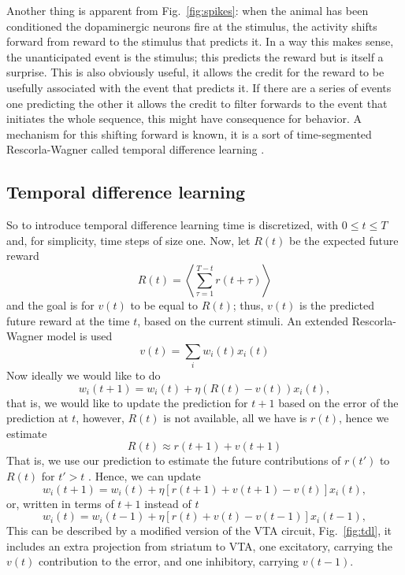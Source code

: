 \documentclass[11pt,a4paper]{scrartcl}
\begin{document}
Another thing is apparent from Fig.~\ref{fig:spikes}: when the animal
has been conditioned the dopaminergic neurons fire at the stimulus,
the activity shifts forward from reward to the stimulus that predicts
it. In a way this makes sense, the unanticipated event is the
stimulus; this predicts the reward but is itself a surprise. This is
also obviously useful, it allows the credit for the reward to be
usefully associated with the event that predicts it. If there are a
series of events one predicting the other it allows the credit to
filter forwards to the event that initiates the whole sequence, this
might have consequence for behavior. A mechanism for this shifting
forward is known, it is a sort of time-segmented Rescorla-Wagner
called temporal difference learning
\cite{Sutton1988a,SuttonBarto1998a}.

\subsection*{Temporal difference learning}

So to introduce temporal difference learning time is discretized, with
$0\le t\le T$ and, for simplicity, time steps of size one. Now, let $R(t)$ be the expected future reward
\begin{equation}
R(t)=\left\langle \sum_{\tau=1}^{T-t}r(t+\tau)\right\rangle
\end{equation}
and the goal is for $v(t)$ to be equal to $R(t)$; thus, $v(t)$ is the
predicted future reward at the time $t$, based on the current stimuli. An extended Rescorla-Wagner model is used
\begin{equation}
v(t)=\sum_i w_i(t)x_i(t)
\end{equation}
Now ideally we would like to do
\begin{equation}
w_i(t+1)=w_i(t)+\eta(R(t)-v(t))x_i(t),
\end{equation}
that is, we would like to update the prediction for $t+1$ based on the error of the prediction at $t$, however, $R(t)$ is not available, all we have is $r(t)$, hence we estimate
\begin{equation}
R(t)\approx r(t+1)+v(t+1)
\end{equation}
That is, we use our prediction to estimate the future contributions of $r(t')$ to $R(t)$ for $t'>t$ \cite{Barto1995a}. Hence, we can update
\begin{equation}
w_i(t+1)=w_i(t)+\eta[r(t+1)+v(t+1)-v(t)]x_i(t),
\end{equation}
or, written in terms of $t+1$ instead of $t$
\begin{equation}
w_i(t)=w_i(t-1)+\eta[r(t)+v(t)-v(t-1)]x_i(t-1),
\end{equation}
This can be described by a modified version of the VTA circuit, Fig.~\ref{fig:tdl}, it includes an extra projection from striatum to VTA, one excitatory, carrying the $v(t)$ contribution to the error, and one inhibitory, carrying $v(t-1)$.
\end{document}
